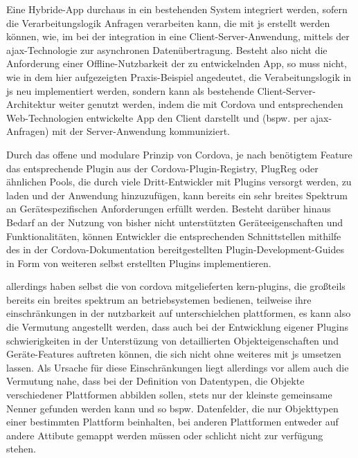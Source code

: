 
Eine Hybride-App durchaus in ein bestehenden System integriert werden, sofern die Verarbeitungslogik Anfragen verarbeiten kann, die mit \gls{js} erstellt werden können, wie, im \zB bei der integration in eine Client-Server-Anwendung, mittels der \gls{ajax}-Technologie zur asynchronen Datenübertragung.
Besteht also nicht die Anforderung einer Offline-Nutzbarkeit der zu entwickelnden App, so muss nicht, wie in dem hier aufgezeigten Praxis-Beispiel angedeutet, die Verabeitungslogik in \gls{js} neu implementiert werden, sondern kann als bestehende Client-Server-Architektur weiter genutzt werden, indem die mit Cordova und entsprechenden Web-Technologien entwickelte App den Client darstellt und (bspw. per \gls{ajax}-Anfragen) mit der Server-Anwendung kommuniziert.



Durch das offene und modulare Prinzip von Cordova, je nach benötigtem Feature das entsprechende Plugin aus der Cordova-Plugin-Registry, PlugReg oder ähnlichen Pools, die durch viele Dritt-Entwickler mit Plugins versorgt werden, zu laden und der Anwendung hinzuzufügen, kann bereits ein sehr breites Spektrum an Gerätespezifischen Anforderungen erfüllt werden.
Besteht darüber hinaus Bedarf an der Nutzung von bisher nicht unterstützten Geräteeigenschaften und Funktionalitäten, können Entwickler die entsprechenden Schnittstellen mithilfe des in der Cordova-Dokumentation bereitgestellten Plugin-Development-Guides in Form von weiteren selbst erstellten Plugins implementieren. 



allerdings haben selbst die von cordova mitgelieferten kern-plugins, die großteils bereits ein breites spektrum an betriebsystemen bedienen, teilweise ihre einschränkungen in der nutzbarkeit auf unterschielchen plattformen, es kann also die Vermutung angestellt werden, dass auch bei der Entwicklung eigener Plugins schwierigkeiten in der Unterstüzung von detaillierten Objekteigenschaften und Geräte-Features auftreten können, die sich nicht ohne weiteres mit \gls{js} umsetzen lassen. 
Als Ursache für diese Einschränkungen liegt allerdings vor allem auch die Vermutung nahe, dass bei der Definition von Datentypen, die Objekte verschiedener Plattformen abbilden sollen, stets nur der kleinste gemeinsame Nenner gefunden werden kann und so bspw. Datenfelder, die nur Objekttypen einer bestimmten Plattform beinhalten, bei anderen Plattformen entweder auf andere Attibute gemappt werden müssen oder schlicht nicht zur verfügung stehen. 

